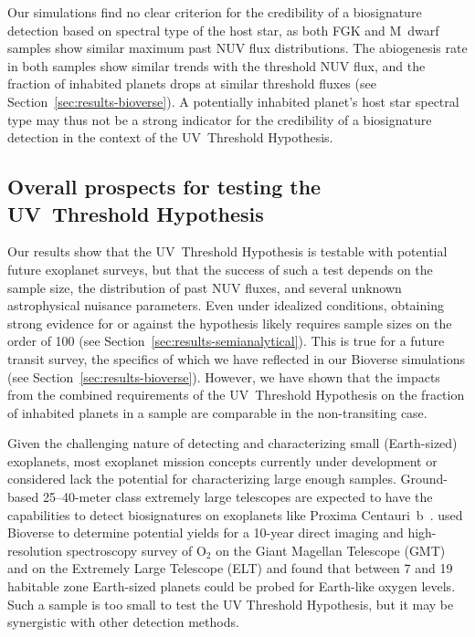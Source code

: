 \documentclass[twocolumn,twocolappendix,linenumbers]{aastex631}
\begin{document}
Our simulations find no clear criterion for the credibility of a biosignature detection based on spectral type of the host star, as both FGK and M~dwarf samples show similar maximum past \gls{NUV} flux distributions.
The abiogenesis rate in both samples show similar trends with the threshold \gls{NUV} flux, and the fraction of inhabited planets drops at similar threshold fluxes (see Section~\ref{sec:results-bioverse}).
A potentially inhabited planet's host star spectral type may thus not be a strong indicator for the credibility of a biosignature detection in the context of the UV~Threshold Hypothesis.

\subsection{Overall prospects for testing the UV~Threshold Hypothesis} %
Our results show that the UV~Threshold Hypothesis is testable with potential future exoplanet surveys, but that the success of such a test depends on the sample size, the distribution of past \gls{NUV} fluxes, and several unknown astrophysical nuisance parameters.
Even under idealized conditions, obtaining strong evidence for or against the hypothesis likely requires sample sizes on the order of 100 (see Section~\ref{sec:results-semianalytical}).
This is true for a future transit survey, the specifics of which we have reflected in our Bioverse simulations (see Section~\ref{sec:results-bioverse}).
However, we have shown that the impacts from the combined requirements of the UV~Threshold Hypothesis on the fraction of inhabited planets in a sample are comparable in the non-transiting case.

Given the challenging nature of detecting and characterizing small (Earth-sized) exoplanets, most exoplanet mission concepts currently under development or considered lack the potential for characterizing large enough samples.
Ground-based 25--40-meter class extremely large telescopes are expected to have the capabilities to detect biosignatures on exoplanets like Proxima Centauri~b~\citep[e.g.,][]{Wang2017,Hawker2019,Zhang2024,Vaughan2024}.
\citet{Hardegree-Ullman2024} used Bioverse to determine potential yields for a 10-year direct imaging and high-resolution spectroscopy survey of O$_2$ on the Giant Magellan Telescope (GMT) and on the Extremely Large Telescope (ELT) and found that between 7 and 19 habitable zone Earth-sized planets could be probed for Earth-like oxygen levels.
Such a sample is too small to test the UV Threshold Hypothesis, but it may be synergistic with other detection methods.
\end{document}
